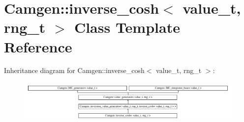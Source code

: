 \hypertarget{a00320}{}\section{Camgen\+:\+:inverse\+\_\+cosh$<$ value\+\_\+t, rng\+\_\+t $>$ Class Template Reference}
\label{a00320}
Inheritance diagram for Camgen\+:\+:inverse\+\_\+cosh$<$ value\+\_\+t, rng\+\_\+t $>$\+:\begin{figure}[H]
\begin{center}
\leavevmode
\includegraphics[height=2.174757cm]{a00320}
\end{center}
\end{figure}
